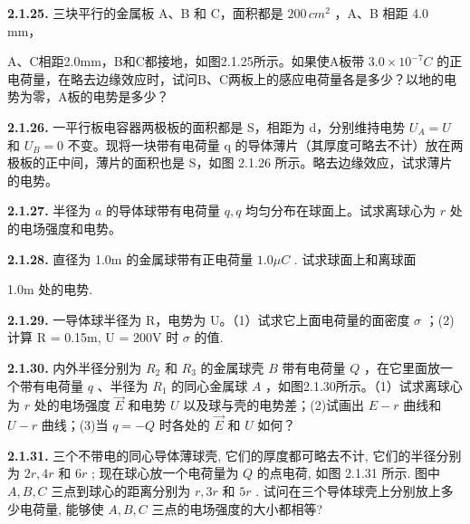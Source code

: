 \textbf{2.1.25.} 三块平行的金属板 A、B 和 C，面积都是 $200 \, cm^{2}$ ，A、B 相距 4.0 mm，

A、C相距2.0mm，B和C都接地，如图2.1.25所示。如果使A板带 $3.0\times10^{-7}C$ 的正电荷量，在略去边缘效应时，试问B、C两板上的感应电荷量各是多少？以地的电势为零，A板的电势是多少？

\begin{center}
\end{center}

\vfill
\newpage

\textbf{2.1.26.} 一平行板电容器两极板的面积都是 S，相距为 d，分别维持电势 $U_{A}=U$ 和 $U_{B}=0$ 不变。现将一块带有电荷量 q 的导体薄片（其厚度可略去不计）放在两极板的正中间，薄片的面积也是 S，如图 2.1.26 所示。略去边缘效应，试求薄片的电势。

\begin{center}
\end{center}

\vfill
\newpage

\textbf{2.1.27.} 半径为 $a$ 的导体球带有电荷量 $q, q$ 均匀分布在球面上。试求离球心为 $r$ 处的电场强度和电势。

\vfill
\newpage

\textbf{2.1.28.} 直径为 1.0m 的金属球带有正电荷量 $1.0\mu C$ . 试求球面上和离球面

1.0m 处的电势.

\vfill
\newpage

\textbf{2.1.29.} 一导体球半径为 R，电势为 U。（1）试求它上面电荷量的面密度 $\sigma$ ；(2) 计算 R = 0.15m, U = 200V 时 $\sigma$ 的值.

\vfill
\newpage

\textbf{2.1.30.} 内外半径分别为 $R_{2}$ 和 $R_{3}$ 的金属球壳 $B$ 带有电荷量 $Q$ ，在它里面放一个带有电荷量 $q$ 、半径为 $R_{1}$ 的同心金属球 $A$ ，如图2.1.30所示。（1）试求离球心为 $r$ 处的电场强度 $\vec{E}$ 和电势 $U$ 以及球与壳的电势差；(2)试画出 $E - r$ 曲线和 $U - r$ 曲线；(3)当 $q = -Q$ 时各处的 $\vec{E}$ 和 $U$ 如何？

\begin{center}
\end{center}

\vfill
\newpage

\textbf{2.1.31.} 三个不带电的同心导体薄球壳, 它们的厚度都可略去不计, 它们的半径分别为 $2r, 4r$ 和 $6r$ ; 现在球心放一个电荷量为 $Q$ 的点电荷, 如图 2.1.31 所示. 图中 $A, B, C$ 三点到球心的距离分别为 $r, 3r$ 和 $5r$ . 试问在三个导体球壳上分别放上多少电荷量, 能够使 $A, B, C$ 三点的电场强度的大小都相等?

